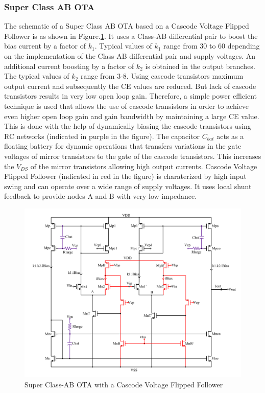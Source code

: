 \subsubsection{Super Class AB OTA}
The schematic of a Super Class AB OTA based on a Cascode Voltage Flipped Follower is as shown in Figure.\ref{fig:OTA_Class_AB}. It uses a Class-AB differential pair to boost the bias current by a factor of $k_1$. Typical values of $k_1$ range from 30 to 60 depending on the implementation of the Class-AB differential pair and supply voltages. An additional current boosting by a factor of $k_2$ is obtained in the output branches. The typical values of $k_2$ range from 3-8. Using cascode transistors maximum output current and subsequently the CE values are reduced. But lack of cascode transistors results in very low open loop gain. Therefore, a simple power efficient technique is used that allows the use of cascode transistors in order to achieve even higher open loop gain and gain bandwidth by maintaining a large CE value. This is done with the help of dynamically biasing the cascode transistors using RC networks (indicated in purple in the figure). The capacitor $C_{bat}$ acts as a floating battery for dynamic operations that transfers variations in the gate voltages of mirror transistors to the gate of the cascode transistors. This increases the $V_{DS}$ of the mirror transistors allowing high output currents. Cascode Voltage Flipped Follower (indicated in red in the figure) is charaterized by high input swing and can operate over a wide range of supply voltages. It uses local shunt feedback to provide nodes A and B with very low impedance.

\begin{figure} [H]
\centering
\includegraphics[scale=0.65]{Figures/Misc/OTA_Class_AB.pdf}
\caption{Super Class-AB OTA with a Cascode Voltage Flipped Follower}
\label{fig:OTA_Class_AB}
\end{figure}

